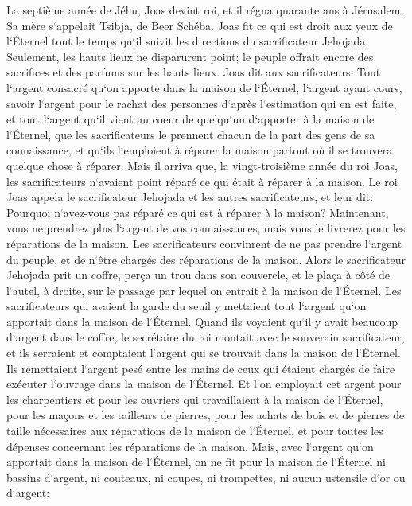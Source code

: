 \verse La septième année de Jéhu, Joas devint roi, et il régna quarante ans à Jérusalem. Sa mère s`appelait Tsibja, de Beer Schéba. 
\verse Joas fit ce qui est droit aux yeux de l`Éternel tout le temps qu`il suivit les directions du sacrificateur Jehojada. 
\verse Seulement, les hauts lieux ne disparurent point; le peuple offrait encore des sacrifices et des parfums sur les hauts lieux. 
\verse Joas dit aux sacrificateurs: Tout l`argent consacré qu`on apporte dans la maison de l`Éternel, l`argent ayant cours, savoir l`argent pour le rachat des personnes d`après l`estimation qui en est faite, et tout l`argent qu`il vient au coeur de quelqu`un d`apporter à la maison de l`Éternel, 
\verse que les sacrificateurs le prennent chacun de la part des gens de sa connaissance, et qu`ils l`emploient à réparer la maison partout où il se trouvera quelque chose à réparer. 
\verse Mais il arriva que, la vingt-troisième année du roi Joas, les sacrificateurs n`avaient point réparé ce qui était à réparer à la maison. 
\verse Le roi Joas appela le sacrificateur Jehojada et les autres sacrificateurs, et leur dit: Pourquoi n`avez-vous pas réparé ce qui est à réparer à la maison? Maintenant, vous ne prendrez plus l`argent de vos connaissances, mais vous le livrerez pour les réparations de la maison. 
\verse Les sacrificateurs convinrent de ne pas prendre l`argent du peuple, et de n`être chargés des réparations de la maison. 
\verse Alors le sacrificateur Jehojada prit un coffre, perça un trou dans son couvercle, et le plaça à côté de l`autel, à droite, sur le passage par lequel on entrait à la maison de l`Éternel. Les sacrificateurs qui avaient la garde du seuil y mettaient tout l`argent qu`on apportait dans la maison de l`Éternel. 
\verse Quand ils voyaient qu`il y avait beaucoup d`argent dans le coffre, le secrétaire du roi montait avec le souverain sacrificateur, et ils serraient et comptaient l`argent qui se trouvait dans la maison de l`Éternel. 
\verse Ils remettaient l`argent pesé entre les mains de ceux qui étaient chargés de faire exécuter l`ouvrage dans la maison de l`Éternel. Et l`on employait cet argent pour les charpentiers et pour les ouvriers qui travaillaient à la maison de l`Éternel, 
\verse pour les maçons et les tailleurs de pierres, pour les achats de bois et de pierres de taille nécessaires aux réparations de la maison de l`Éternel, et pour toutes les dépenses concernant les réparations de la maison. 
\verse Mais, avec l`argent qu`on apportait dans la maison de l`Éternel, on ne fit pour la maison de l`Éternel ni bassins d`argent, ni couteaux, ni coupes, ni trompettes, ni aucun ustensile d`or ou d`argent: 
